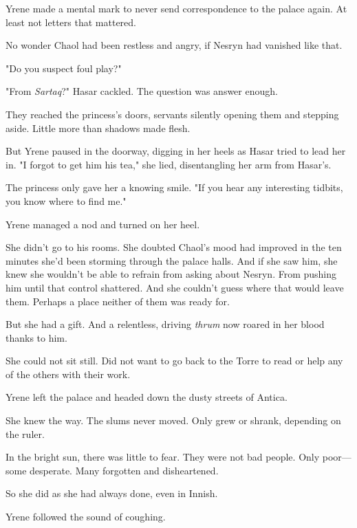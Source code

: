 Yrene made a mental mark to never send correspondence to the palace again. At least not letters that mattered.

No wonder Chaol had been restless and angry, if Nesryn had vanished like that.

"Do you suspect foul play?"

"From \emph{Sartaq}?" Hasar cackled. The question was answer enough.

They reached the princess's doors, servants silently opening them and stepping aside. Little more than shadows made flesh.

But Yrene paused in the doorway, digging in her heels as Hasar tried to lead her in. "I forgot to get him his tea," she lied, disentangling her arm from Hasar's.

The princess only gave her a knowing smile. "If you hear any interesting tidbits, you know where to find me."

Yrene managed a nod and turned on her heel.

She didn't go to his rooms. She doubted Chaol's mood had improved in the ten minutes she'd been storming through the palace halls. And if she saw him, she knew she wouldn't be able to refrain from asking about Nesryn. From pushing him until that control shattered. And she couldn't guess where that would leave them. Perhaps a place neither of them was ready for.

But she had a gift. And a relentless, driving \emph{thrum} now roared in her blood thanks to him.

She could not sit still. Did not want to go back to the Torre to read or help any of the others with their work.

Yrene left the palace and headed down the dusty streets of Antica.

She knew the way. The slums never moved. Only grew or shrank, depending on the ruler.

In the bright sun, there was little to fear. They were not bad people. Only poor---some desperate. Many forgotten and disheartened.

So she did as she had always done, even in Innish.

Yrene followed the sound of coughing.

